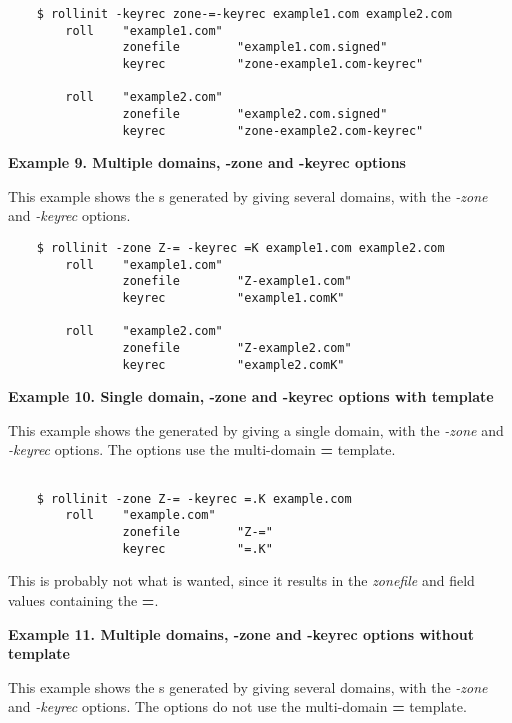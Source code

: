 \begin{verbatim}
    $ rollinit -keyrec zone-=-keyrec example1.com example2.com
        roll    "example1.com"
                zonefile        "example1.com.signed"
                keyrec          "zone-example1.com-keyrec"

        roll    "example2.com"
                zonefile        "example2.com.signed"
                keyrec          "zone-example2.com-keyrec"
\end{verbatim}

{\bf Example 9.  Multiple domains, -zone and -keyrec options}

This example shows the s generated by giving 
several domains, with the {\it -zone} and {\it -keyrec} options.

\begin{verbatim}
    $ rollinit -zone Z-= -keyrec =K example1.com example2.com
        roll    "example1.com"
                zonefile        "Z-example1.com"
                keyrec          "example1.comK"

        roll    "example2.com"
                zonefile        "Z-example2.com"
                keyrec          "example2.comK"
\end{verbatim}

{\bf Example 10.  Single domain, -zone and -keyrec options with template}

This example shows the  generated by giving  a
single domain, with the {\it -zone} and {\it -keyrec} options.  The options
use the multi-domain {\bf =} template.

\begin{verbatim}

    $ rollinit -zone Z-= -keyrec =.K example.com
        roll    "example.com"
                zonefile        "Z-="
                keyrec          "=.K"

\end{verbatim}

This is probably not what is wanted, since it results in the {\it zonefile}
and  field values containing the {\bf =}.

{\bf Example 11.  Multiple domains, -zone and -keyrec options without template}

This example shows the s generated by giving 
several domains, with the {\it -zone} and {\it -keyrec} options.  The options
do not use the multi-domain {\bf =} template.

